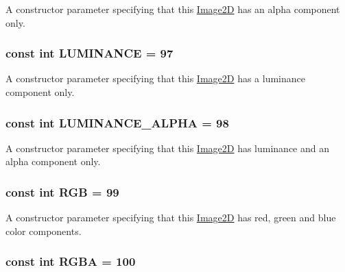 A constructor parameter specifying that this \hyperlink{classm3g_1_1Image2D}{Image2D} has an alpha component only. \hypertarget{classm3g_1_1Image2D_3cf02f5117269e8ff112cbf5ecb790cd}{
\subsubsection[{LUMINANCE}]{\setlength{\rightskip}{0pt plus 5cm}const int {\bf LUMINANCE} = 97}}
\label{classm3g_1_1Image2D_3cf02f5117269e8ff112cbf5ecb790cd}


A constructor parameter specifying that this \hyperlink{classm3g_1_1Image2D}{Image2D} has a luminance component only. \hypertarget{classm3g_1_1Image2D_1a74b878039f244c27120cacb4eb6a3e}{
\subsubsection[{LUMINANCE\_\-ALPHA}]{\setlength{\rightskip}{0pt plus 5cm}const int {\bf LUMINANCE\_\-ALPHA} = 98}}
\label{classm3g_1_1Image2D_1a74b878039f244c27120cacb4eb6a3e}


A constructor parameter specifying that this \hyperlink{classm3g_1_1Image2D}{Image2D} has luminance and an alpha component only. \hypertarget{classm3g_1_1Image2D_5f237f1b0f2ce6351e9e4a494b8dc759}{
\subsubsection[{RGB}]{\setlength{\rightskip}{0pt plus 5cm}const int {\bf RGB} = 99}}
\label{classm3g_1_1Image2D_5f237f1b0f2ce6351e9e4a494b8dc759}


A constructor parameter specifying that this \hyperlink{classm3g_1_1Image2D}{Image2D} has red, green and blue color components. \hypertarget{classm3g_1_1Image2D_0aaf9f2f4c064633c6d2888ec2c39e92}{
\subsubsection[{RGBA}]{\setlength{\rightskip}{0pt plus 5cm}const int {\bf RGBA} = 100}}
\label{classm3g_1_1Image2D_0aaf9f2f4c064633c6d2888ec2c39e92}


